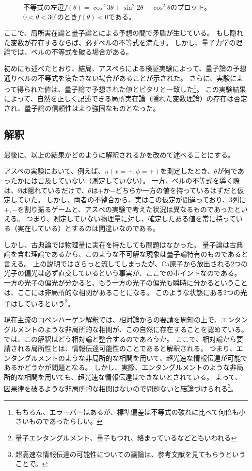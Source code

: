 \documentclass[10pt,b5paper,papersize,dvipdfmx]{jsbook}
\begin{document}
\begin{figure}[htp] \small
  \centering
  
  \caption{不等式の左辺$f(\theta) = \cos^2 3\theta + \sin^2 2\theta - \cos^2\theta$のプロット。$0 < \theta < 30^\circ$のとき$f(\theta) < 0$である。}
  \label{fig:left-hen}
\end{figure}

ここで、局所実在論と量子論とによる予想の間で矛盾が生じている。
もし隠れた変数が存在するならば、必ずベルの不等式を満たす。
しかし、量子力学の理論では、ベルの不等式を破る場合がある。

初めにも述べたとおり、結局、アスペらによる検証実験によって、量子論の予想通りベルの不等式を満たさない場合があることが示された。
さらに、実験によって得られた値は、量子論で予想された値とピタリと一致した\footnote{
  もちろん、エラーバーはあるが、標準偏差は不等式の破れに比べて何倍も小さいものであったらしい\cite{arafuna}。
}。
この実験結果によって、自然を正しく記述できる局所実在論（隠れた変数理論）の存在は否定され、量子論の信頼性はより強固なものとなった。

%
\subsection{解釈} \label{subsec:interpretation}%

最後に、以上の結果がどのように解釈されるかを改めて述べることにする。\par
アスペの実験において、例えば、$n(x=+,\phi=+)$を測定したとき、$\theta$が何であったかには言及していない（測定していない）。
一方、ベルの不等式を導く際は、$\theta$は隠れているだけで、$\theta$は$+$か$-$どちらか一方の値を持っているはずだと仮定していた。
しかし、両者の不整合から、実はこの仮定が間違っており、3列に$+,-$を割り振るゲームと、アスぺの実験で考えた状況は異なるものであったといえる。
つまり、測定していない物理量に対し、確定したある値を常に持っている（実在している）とするのは間違いなのである。\par
しかし、古典論では物理量に実在を持たしても問題はなかった。
量子論は古典論を含む理論であるから、このような不可解な現象は量子論特有のものであると言える。
上の説明ではさらっと流してしまったが、Ca原子から放出される2つの光子の偏光は必ず直交しているという事実が、ここでのポイントなのである。
一方の光子の偏光が分かると、もう一方の光子の偏光も瞬時に分かるということは、ここには非局所的な相関があることになる。
このような状態にある2つの光子はしているという\footnote{
  量子エンタングルメント、量子もつれ、絡まっているなどともいわれる
}。\par
現在主流のコペンハーゲン解釈では、相対論からの要請を周知の上で、エンタングルメントのような非局所的な相関が、この自然に存在することを認めている。
では、この解釈はどう相対論と整合するのであろうか。
ここで、相対論から要請される局所性とは、情報伝達可能性のことであると解釈される。
つまり、エンタングルメントのような非局所的な相関を用いて、超光速な情報伝達が可能であるかどうかが問題となる。
しかし、実際、エンタングルメントのような非局所的な相関を用いても、超光速な情報伝達はできないとされている。
よって、因果律を破るような非局所的な相関はないので問題ないと結論づけられる\footnote{
  超高速な情報伝達の可能性についての議論は、参考文献\cite{arafuna}を見てもらうということで。
}。
\end{document}
